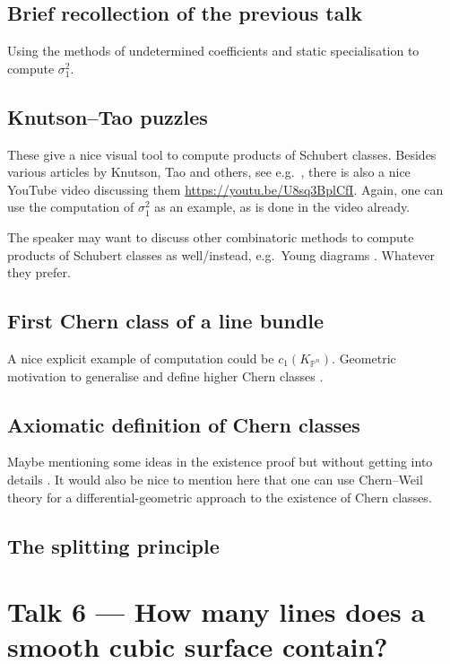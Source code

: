 \documentclass[A4paper, 12pt, british, reqno]{amsart}
\renewcommand{\P}{\mathbb{P}} %
\theoremstyle{plain}
\theoremstyle{definition}
\theoremstyle{remark}
\theoremstyle{plain}
\theoremstyle{definition}
\theoremstyle{remark}
\theoremstyle{plain}
\theoremstyle{definition}
\theoremstyle{remark}
\begin{document}
\subsection{Brief recollection of the previous talk}
Using the methods of undetermined coefficients and static specialisation to compute $\sigma_{1}^{2}$.

\subsection{Knutson--Tao puzzles}
These give a nice visual tool to compute products of Schubert classes.
Besides various articles by Knutson, Tao and others, see e.g.~\cite{ktw04}, there is also a nice YouTube video discussing them \href{https://youtu.be/U8sq3BplCfI}{https://youtu.be/U8sq3BplCfI}.
Again, one can use the computation of $\sigma_{1}^{2}$ as an example, as is done in the video already.

The speaker may want to discuss other combinatoric methods to compute products of Schubert classes as well/instead, e.g.~Young diagrams \cite[\S 4.5]{eh16}.
Whatever they prefer.

\subsection{First Chern class of a line bundle \cite[\S 1.4]{eh16}}
A nice explicit example of computation could be $c_{1}(K_{\P^{n}})$.
Geometric motivation to generalise and define higher Chern classes \cite[\S 5.2]{eh16}.

\subsection{Axiomatic definition of Chern classes}
Maybe mentioning some ideas in the existence proof but without getting into details \cite[\S 5.3]{eh16}.
It would also be nice to mention here that one can use Chern--Weil theory for a differential-geometric approach to the existence of Chern classes.

\subsection{The splitting principle \cite[\S 5.4]{eh16}}

\section{Talk 6 --- How many lines does a smooth cubic surface contain?}
\end{document}
